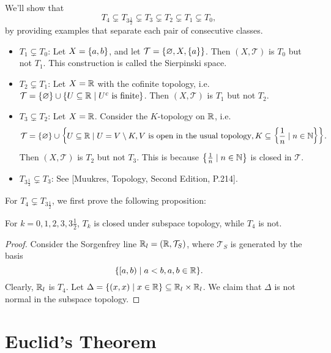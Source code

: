 \begin{ex}
    We'll show that
    \[
    T_4 \subsetneq T_{3\frac 1 2} \subsetneq T_3 \subsetneq T_2 \subsetneq T_1 \subsetneq T_0,
    \]
    by providing examples that separate each pair of consecutive classes.
    \begin{itemize}
        \item $T_1 \subsetneq T_0$: Let $X = {\left\{{a, b}\right\}}$, and let $\mathcal T = {\left\{{\varnothing, X, {\left\{{a}\right\}}}\right\}}$. Then $(X, \mathcal T)$ is $T_0$ but not $T_1$. This construction is called the Sierpinski space.
        \item $T_2 \subsetneq T_1$: Let $X = {\mathbb R}$ with the cofinite topology, i.e. $\mathcal T = {\left\{{\varnothing}\right\}} \cup {\left\{{U\subseteq {\mathbb R}\mid U^c \text{ is finite}}\right\}}$. Then $(X, \mathcal T)$ is $T_1$ but not $T_2$.
        \item $T_3 \subsetneq T_2$: Let $X = {\mathbb R}$. Consider the $K$-topology on ${\mathbb R}$, i.e. 
        \[
        \mathcal T = {\left\{{\varnothing}\right\}} \cup {\left\{{U\subseteq {\mathbb R}\mid U = V\setminus K, V \text{ is open in the usual topology}, K\subseteq {\left\{{\frac1n \mid n\in {\mathbb N}}\right\}}}\right\}}.
        \]
        Then $(X, \mathcal T)$ is $T_2$ but not $T_3$. This is because ${\left\{{\frac1n \mid n\in {\mathbb N}}\right\}}$ is closed in $\mathcal T$.
        \item $T_{3\frac12} \subsetneq T_3$: See [Muukres, Topology, Second Edition, P.214].
    \end{itemize}
    For $T_4 \subsetneq T_{3\frac 1 2}$, we first prove the following proposition:
    \begin{prop}
        For $k = 0, 1, 2, 3, 3\frac12$, $T_k$ is closed under subspace topology, while $T_4$ is not.
        \begin{proof}
            Consider the Sorgenfrey line ${\mathbb R}_l = ({\mathbb R}, \mathcal T_S)$, where $\mathcal T_S$ is generated by the basis
            \[
            {\left\{{[a, b) \mid a < b, a, b\in {\mathbb R}}\right\}}.
            \]
            Clearly, ${\mathbb R}_l$ is $T_4$. Let $\Delta = {\left\{{(x, x) \mid x\in {\mathbb R}}\right\}} \subseteq {\mathbb R}_l \times {\mathbb R}_l$. We claim that $\Delta$ is not normal in the subspace topology.
        \end{proof}
    \end{prop}
\end{ex}

\section{Euclid's Theorem}

